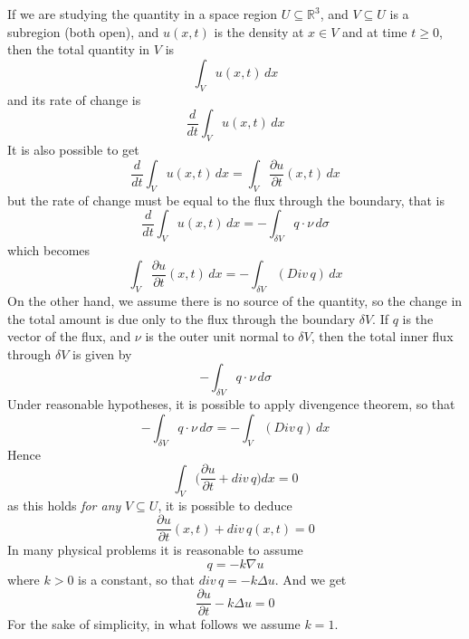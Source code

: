 If we are studying the quantity in a space region \( U \subseteq \mathbb{R}^3 \), and \( V \subseteq U  \) is a subregion (both open), and \( u(x,t) \) is the density at  \( x  \in V \) and at time \( t \geq 0\), then the total quantity in \( V \) is
\[
 \int_V u(x,t) \, dx
\]
and its rate of change is 
\begin{equation*}
    \frac{d}{dt} \int_V u(x,t) \, dx
\end{equation*}
It is also possible to get 
\begin{equation*}
    \frac{d}{dt} \int_V u(x,t) \, dx = \int_V \frac{\partial u}{\partial t }(x,t) \, dx
\end{equation*}
but the rate of change must be equal to the flux through the boundary, that  is 
\begin{equation*}
    \frac{d}{dt} \int_V u(x,t) \, dx = - \int_{\delta V} q \cdot \nu \, d\sigma
\end{equation*}
which becomes 
\begin{equation*}
   \int_V  \frac{\partial u}{\partial t}  (x,t) \, dx = - \int_{\delta V} (Div \, q) \, dx
\end{equation*}
On the other hand, we assume there is no source of the quantity, so the change in the total amount is due only to the flux through the boundary $\delta V$. If $q$ is the vector of the flux, and $\nu$ is the outer unit normal to $\delta V$, then the total inner flux through $\delta V$ is given by 
\begin{equation*}
    -\int_{\delta V} q \cdot \nu \, d\sigma 
\end{equation*}
Under reasonable hypotheses, it is possible to apply divengence theorem, so that 
\begin{equation*}
    -\int_{\delta V} q \cdot \nu \, d\sigma = - \int_{ V} (Div \, q) \, dx
\end{equation*}
Hence 
\begin{equation*}
    \int_V \big( \frac{\partial u}{\partial t} + div \, q \big)dx =0
\end{equation*}
as this holds \emph{for any} $V\subseteq U$, it is possible to deduce 
\begin{equation*}
    \frac{\partial u}{\partial t} (x,t) + div \, q (x,t)=0
\end{equation*}
In many physical problems it is reasonable to assume 
\begin{equation*}
    q = -k \nabla u 
\end{equation*}
where $k> 0$ is a constant, so that $div \, q= -k \Delta u$. And we get 
\begin{equation*}
    \frac{\partial u}{\partial t}-k \Delta u =0
\end{equation*}
For the sake of simplicity, in what follows we assume \( k = 1 \).


